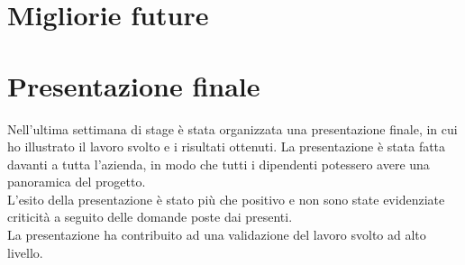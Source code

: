 \section{Migliorie future}
\section{Presentazione finale}
Nell'ultima settimana di stage è stata organizzata una presentazione finale, in cui ho illustrato il lavoro svolto e i risultati ottenuti.
La presentazione è stata fatta davanti a tutta l'azienda, in modo che tutti i dipendenti potessero avere una panoramica del progetto.\\
L'esito della presentazione è stato più che positivo e non sono state evidenziate criticità a seguito delle domande poste dai presenti.\\
La presentazione ha contribuito ad una validazione del lavoro svolto ad alto livello.








